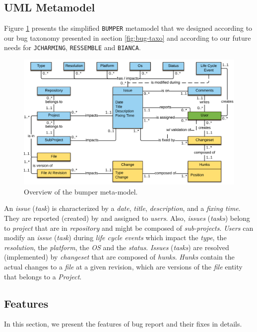 \subsection{UML Metamodel}

Figure \ref{fig:bumper-approach} presents the simplified {\tt BUMPER} metamodel that we designed according to our bug taxonomy presented in section \ref{fig:bug-taxo} and according to our future needs for {\tt JCHARMING}, {\tt RESSEMBLE} and {\tt BIANCA}.

\begin{figure}[h!]
  \centering
    \includegraphics{media/bumper-model.png}
    \caption{Overview of the bumper meta-model.
    \label{fig:bumper-approach} }
\end{figure}


An {\it issue} ({\it task}) is characterized by a {\it date}, {\it title}, {\it description}, and a {\it fixing time}. They are reported (created) by and assigned to {\it users}.
Also, {\it issues} ({\it tasks}) belong to {\it project} that are in {\it repository} and might be composed of {\it sub-projects}.
{\it Users} can modify an {\it issue} ({\it task})  during {\it life cycle events} which impact the {\it type}, the {\it resolution}, the {\it platform}, the {\it OS} and the {\it status}. {\it Issues} ({\it tasks}) are resolved (implemented) by {\it changeset} that are composed of {\it hunks}. {\it Hunks} contain the actual changes to a {\it file} at a given revision, which are versions of the {\it file} entity that belongs to a {\it Project}.


\subsection{Features}

In this section, we present the features of bug report and their fixes in details.

